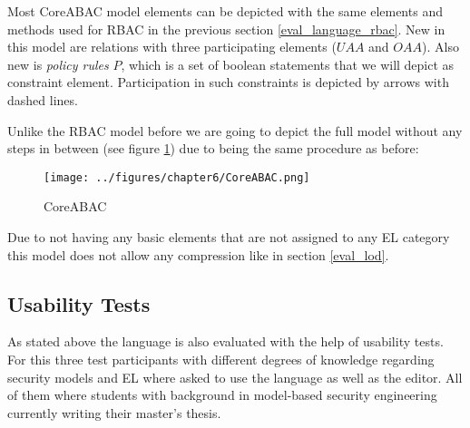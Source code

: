 \documentclass[twoside, openright, 12pt]{book}
\begin{document}
\noindent
Most CoreABAC model elements can be depicted with the same elements and methods used for RBAC in the previous section \ref{eval_language_rbac}.
New in this model are relations with three participating elements ($UAA$ and $OAA$).
Also new is \textit{policy rules} $P$, which is a set of boolean statements that we will depict as constraint element.
Participation in such constraints is depicted by arrows with dashed lines.

Unlike the RBAC model before we are going to depict the full model without any steps in between (see figure \ref{fig:CoreABAC}) due to being the same procedure as before:

\label{eval_language_coreabac}
\begin{figure}[htb]
	\centering
	\texttt{[image: ../figures/chapter6/CoreABAC.png]}
	\caption{CoreABAC}
	\label{fig:CoreABAC}
\end{figure}

\noindent
Due to not having any basic elements that are not assigned to any EL category this model does not allow any compression like in section \ref{eval_lod}.

%



\subsection{Usability Tests}
\label{eval_language_usability}
As stated above the language is also evaluated with the help of usability tests.
For this three test participants with different degrees of knowledge regarding security models and EL where asked to use the language as well as the editor.
All of them where students with background in model-based security engineering currently writing their master's thesis.
\end{document}

